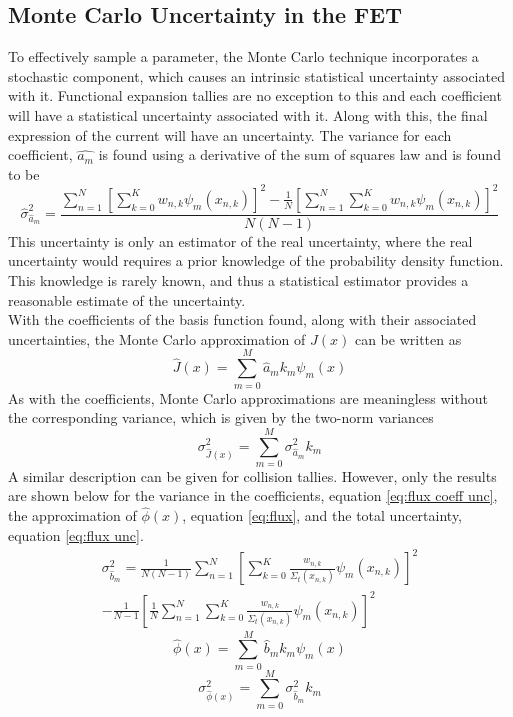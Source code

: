 \documentclass[10tma4paper]{article}
\begin{document}
\subsection{Monte Carlo Uncertainty in the FET}\label{UIC}

To effectively sample a parameter, the Monte Carlo technique incorporates a stochastic component, which causes an intrinsic statistical uncertainty associated with it. Functional expansion tallies are no exception to this and each coefficient will have a statistical uncertainty associated with it. Along with this, the final expression of the current will have an uncertainty. The variance for each coefficient, $\hat{a_{m}}$ is found using a derivative of the sum of squares law and is found to be 
	\begin{equation} \label{eq:coeff unc}
	\hat{\sigma}_{\hat{a}_{m}}^2 = \frac{\sum_{n=1}^{N}[\sum_{k=0}^{K}w_{n,k}\psi_{m}(x_{n,k})]^{2} - \frac{1}{N}[ \sum_{n=1}^{N}\sum_{k=0}^{K}w_{n,k}\psi_{m}(x_{n,k})]^{2}}{N(N-1)}
	\end{equation}
This uncertainty is only  an estimator of the real uncertainty, where the real uncertainty would requires a prior knowledge of the probability density function. This knowledge is rarely known, and thus a statistical estimator provides a reasonable estimate of the uncertainty.
\\
With the coefficients of the basis function found, along with their associated uncertainties, the Monte Carlo approximation of $J(x)$ can be written as
	\begin{equation} \label{eq:current hat}
	\hat{J}(x) = \sum_{m=0}^{M} \hat{a}_{m}k_{m}\psi_{m}(x)
	\end{equation}
As with the coefficients, Monte Carlo approximations are meaningless without the corresponding variance, which is given by the two-norm variances
	\begin{equation} \label{eq:current unc}
	\sigma_{\hat{J}(x)}^2=\sum_{m=0}^{M}\sigma_{\hat{a}_{m}}^2k_{m}
	\end{equation}
A similar description can be given for collision tallies. However, only the results are shown below for the variance in the coefficients, equation \eqref{eq:flux coeff unc}, the approximation of $\hat{\phi}(x)$, equation \eqref{eq:flux}, and the total uncertainty, equation \eqref{eq:flux unc}.
		\begin{equation} \label{eq:flux coeff unc}
		\begin{split}	
		\sigma_{\hat{b}_{m}}^2 = \frac{1}{N(N-1)} \sum_{n=1}^{N}[\sum_{k=0}^{K}\frac{w_{n,k}}{\Sigma_{t}(x_{n,k})}\psi_{m}(x_{n,k})]^{2}\\ -
		\frac{1}{N-1}[\frac{1}{N} \sum_{n=1}^{N}\sum_{k=0}^{K}\frac{w_{n,k}}{\Sigma_{t}(x_{n,k})}\psi_{m}(x_{n,k})]^{2}
		\end{split}	
		\end{equation}
		\begin{equation} \label{eq:flux}
		\hat{\phi}(x)= \sum_{m=0}^{M}\hat{b}_{m}k_{m}\psi_{m}(x)
		\end{equation}
		\begin{equation} \label{eq:flux unc}
		\sigma_{\hat{\phi}(x)}^2=\sum_{m=0}^{M}\sigma_{\hat{b}_{m}}^2k_{m}
		\end{equation}
\end{document}
